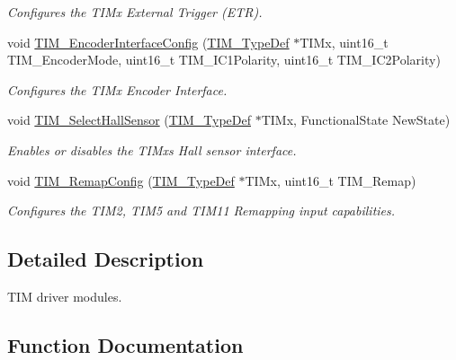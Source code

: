 \begin{DoxyCompactItemize}
\begin{DoxyCompactList}\small\item\em Configures the T\+I\+Mx External Trigger (E\+TR). \end{DoxyCompactList}\item 
void \hyperlink{group___t_i_m_ga0fc7e76c47a3bd1ba1ebc71427832b51}{T\+I\+M\+\_\+\+Encoder\+Interface\+Config} (\hyperlink{struct_t_i_m___type_def}{T\+I\+M\+\_\+\+Type\+Def} $\ast$T\+I\+Mx, uint16\+\_\+t T\+I\+M\+\_\+\+Encoder\+Mode, uint16\+\_\+t T\+I\+M\+\_\+\+I\+C1\+Polarity, uint16\+\_\+t T\+I\+M\+\_\+\+I\+C2\+Polarity)
\begin{DoxyCompactList}\small\item\em Configures the T\+I\+Mx Encoder Interface. \end{DoxyCompactList}\item 
void \hyperlink{group___t_i_m_ga42c2d1025a3937c9d9f38631af86ffa4}{T\+I\+M\+\_\+\+Select\+Hall\+Sensor} (\hyperlink{struct_t_i_m___type_def}{T\+I\+M\+\_\+\+Type\+Def} $\ast$T\+I\+Mx, Functional\+State New\+State)
\begin{DoxyCompactList}\small\item\em Enables or disables the T\+I\+Mx\textquotesingle{}s Hall sensor interface. \end{DoxyCompactList}\item 
void \hyperlink{group___t_i_m_ga08ffb6f2bfa96b6fbcbb8d8001cb8ba9}{T\+I\+M\+\_\+\+Remap\+Config} (\hyperlink{struct_t_i_m___type_def}{T\+I\+M\+\_\+\+Type\+Def} $\ast$T\+I\+Mx, uint16\+\_\+t T\+I\+M\+\_\+\+Remap)
\begin{DoxyCompactList}\small\item\em Configures the T\+I\+M2, T\+I\+M5 and T\+I\+M11 Remapping input capabilities. \end{DoxyCompactList}\end{DoxyCompactItemize}


\subsection{Detailed Description}
T\+IM driver modules. 



\subsection{Function Documentation}
